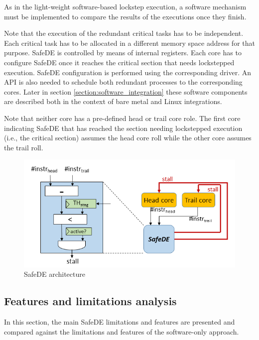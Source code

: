 As in the light-weight software-based lockstep execution, a software mechanism must be implemented to compare the results of the executions once they finish. 

Note that the execution of the redundant critical tasks has to be independent. Each critical task has to be allocated in a different memory space address for that purpose. SafeDE is controlled by means of internal registers. Each core has to configure SafeDE once it reaches the critical section that needs lockstepped execution. SafeDE configuration is performed using the corresponding driver. An API is also needed to schedule both redundant processes to the corresponding cores. Later in section \ref{section:software_integration} these software components are described both in the context of bare metal and Linux integrations.

Note that neither core has a pre-defined head or trail core role. The first core indicating SafeDE that has reached the section needing lockstepped execution (i.e., the critical section) assumes the head core roll while the other core assumes the trail roll.

\begin{figure}[h]
    \centering
    \includegraphics[scale=1]{img/SafeDE_HW.png}
    \caption{SafeDE architecture}
    \label{fig:SafeDE_Arch}
\end{figure}

\bigskip



\subsection{Features and limitations analysis}
\label{section:SafeDE_limitations}

In this section, the main SafeDE limitations and features are presented and compared against the limitations and features of the software-only approach.

